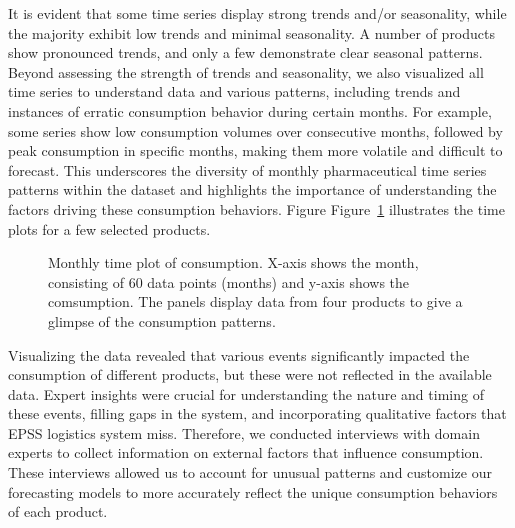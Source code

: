 \documentclass[
  authoryear,
  preprint,
  3p]{elsarticle}
\begin{document}
It is evident that some time series display strong trends and/or
seasonality, while the majority exhibit low trends and minimal
seasonality. A number of products show pronounced trends, and only a few
demonstrate clear seasonal patterns. Beyond assessing the strength of
trends and seasonality, we also visualized all time series to understand
data and various patterns, including trends and instances of erratic
consumption behavior during certain months. For example, some series
show low consumption volumes over consecutive months, followed by peak
consumption in specific months, making them more volatile and difficult
to forecast. This underscores the diversity of monthly pharmaceutical
time series patterns within the dataset and highlights the importance of
understanding the factors driving these consumption behaviors. Figure
Figure~\ref{fig-dataviz2} illustrates the time plots for a few selected
products.

\begin{figure}


\caption{\label{fig-dataviz2}Monthly time plot of consumption. X-axis
shows the month, consisting of 60 data points (months) and y-axis shows
the comsumption. The panels display data from four products to give a
glimpse of the consumption patterns.}

\end{figure}%

Visualizing the data revealed that various events significantly impacted
the consumption of different products, but these were not reflected in
the available data. Expert insights were crucial for understanding the
nature and timing of these events, filling gaps in the system, and
incorporating qualitative factors that EPSS logistics system miss.
Therefore, we conducted interviews with domain experts to collect
information on external factors that influence consumption. These
interviews allowed us to account for unusual patterns and customize our
forecasting models to more accurately reflect the unique consumption
behaviors of each product.
\end{document}
